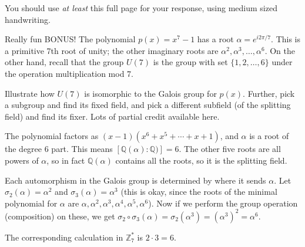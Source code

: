 \documentclass[10pt]{exam}
\def\Z{\mathbb Z}
\def\Q{\mathbb Q}
\begin{document}
\begin{questions}
You should use \emph{at least} this full page for your response, using medium sized handwriting. 

\clearpage

\bonusquestion[15] Really fun BONUS! The polynomial $p(x) = x^7-1$ has a root $\alpha = e^{i2\pi/7}$.  This is a primitive 7th root of unity; the other imaginary roots are $\alpha^2, \alpha^3, \ldots, \alpha^6$.  On the other hand, recall that the group $U(7)$ is the group with set $\{1, 2,\ldots, 6\}$ under the operation multiplication mod 7.

Illustrate how $U(7)$ is isomorphic to the Galois group for $p(x)$.  Further, pick a subgroup and find its fixed field, and pick a different subfield (of the splitting field) and find its fixer.  Lots of partial credit available here.

	\begin{solution}
		The polynomial factors as $(x-1)(x^6+x^5+\cdots + x + 1)$, and $\alpha$ is a root of the degree 6 part.  This means $[\Q(\alpha):\Q)] = 6$.  The other five roots are all powers of $\alpha$, so in fact $\Q(\alpha)$ contains all the roots, so it is the splitting field.

		Each automorphism in the Galois group is determined by where it sends $\alpha$.  Let $\sigma_2(\alpha) = \alpha^2$ and $\sigma_3(\alpha) = \alpha^3$ (this is okay, since the roots of the minimal polynomial for $\alpha$ are $\alpha, \alpha^2, \alpha^3, \alpha^4,\alpha^5,\alpha^6$).  Now if we perform the group operation (composition) on these, we get $\sigma_2\circ \sigma_3(\alpha) = \sigma_2(\alpha^3) = (\alpha^3)^2 = \alpha^6$.

		The corresponding calculation in $\Z_7^*$ is $2\cdot 3 = 6$.
	\end{solution}




\end{questions}
\end{document}
